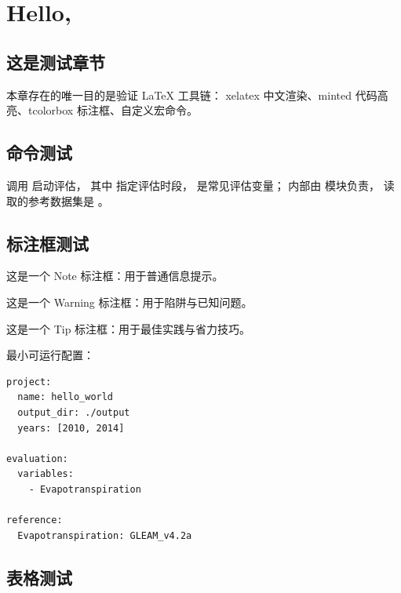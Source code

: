 
\chapter{Hello, \openbench{}}

\section{这是测试章节}

本章存在的唯一目的是验证 LaTeX 工具链：
xelatex 中文渲染、minted 代码高亮、tcolorbox 标注框、自定义宏命令。

\section{命令测试}

调用  启动评估，
其中  指定评估时段，
 是常见评估变量；
内部由  模块负责，
读取的参考数据集是 。

\section{标注框测试}

\begin{noteBox}
这是一个 Note 标注框：用于普通信息提示。
\end{noteBox}

\begin{warnBox}
这是一个 Warning 标注框：用于陷阱与已知问题。
\end{warnBox}

\begin{tipBox}
这是一个 Tip 标注框：用于最佳实践与省力技巧。
\end{tipBox}

\begin{exampleBox}
最小可运行配置：
\begin{verbatim}
project:
  name: hello_world
  output_dir: ./output
  years: [2010, 2014]

evaluation:
  variables:
    - Evapotranspiration

reference:
  Evapotranspiration: GLEAM_v4.2a
\end{verbatim}
\end{exampleBox}

\section{表格测试}

